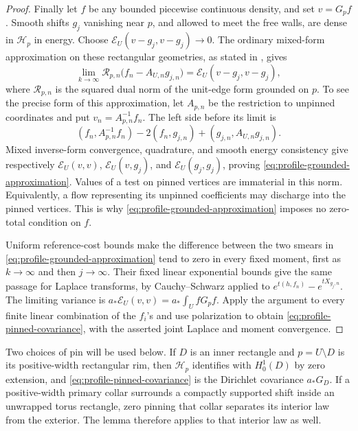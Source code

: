 \begin{proof}
Finally let \(f\) be any bounded piecewise continuous density,
and set \(v=G_pf\).  Smooth shifts \(g_j\) vanishing near \(p\),
and allowed to meet the free walls, are dense in \(\mathcal H_p\)
in energy.  Choose \(\mathcal E_U(v-g_j,v-g_j)\to0\).
The ordinary mixed-form approximation on these rectangular
geometries, as stated in \cite[Section~3.1 and proof of
Theorem~3.1]{X}, gives
\begin{equation}\label{eq:profile-grounded-approximation}
 \lim_{k\to\infty}
 \mathcal R_{p,n}\bigl(f_n-A_{U,n}g_{j,n}\bigr)
                    =\mathcal E_U(v-g_j,v-g_j),
\end{equation}
where \(\mathcal R_{p,n}\) is the squared dual norm of the unit-edge
form grounded on \(p\).  To see the precise form of this approximation,
let \(A_{p,n}\) be the restriction to unpinned coordinates and put
\(v_n=A_{p,n}^{-1}f_n\).  The left side before its limit is
\[
 (f_n,A_{p,n}^{-1}f_n)-2(f_n,g_{j,n})
                +(g_{j,n},A_{U,n}g_{j,n}).
\]
Mixed inverse-form convergence, quadrature, and smooth energy
consistency give respectively
\(\mathcal E_U(v,v)\), \(\mathcal E_U(v,g_j)\), and
\(\mathcal E_U(g_j,g_j)\), proving
\eqref{eq:profile-grounded-approximation}.  Values of a test on pinned vertices are
immaterial in this norm.  Equivalently, a flow representing its
unpinned coefficients may discharge into the pinned vertices.
This is why \eqref{eq:profile-grounded-approximation} imposes no
zero-total condition on \(f\).

Uniform reference-cost bounds make the difference between the two
smears in \eqref{eq:profile-grounded-approximation} tend to zero
in every fixed moment, first as \(k\to\infty\) and then
\(j\to\infty\).  Their fixed linear exponential bounds give the
same passage for Laplace transforms, by Cauchy--Schwarz applied to
\(e^{t(h,f_n)}-e^{tX_{g_j,n}}\).  The limiting variance is
\(a_*\mathcal E_U(v,v)=a_*\int_UfG_pf\).
Apply the argument to every finite linear combination of the
\(f_i\)'s and use polarization to obtain
\eqref{eq:profile-pinned-covariance}, with the asserted joint
Laplace and moment convergence.
\end{proof}

Two choices of pin will be used below.  If \(D\) is an inner rectangle
and \(p=U\setminus D\) is its positive-width rectangular rim, then
\(\mathcal H_p\) identifies
with \(H^1_0(D)\) by zero extension, and
\eqref{eq:profile-pinned-covariance} is the Dirichlet covariance
\(a_*G_D\).  If a positive-width primary collar surrounds a compactly
supported shift inside an unwrapped torus rectangle, zero pinning
that collar separates its interior law from the exterior.  The lemma
therefore applies to that interior law as well.


